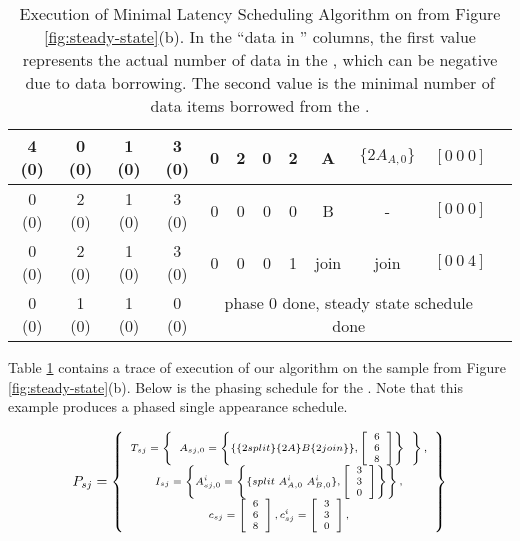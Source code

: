 \begin{table}[t]
\begin{tabular}{|c|c|c|c|c|c|c|c|c|c|c|c|}
\hline 4 (0) & 0 (0) & 1 (0) & 3 (0) & 0 & 2 & 0 & 2 & A & $\{2A_{A,0}\}$ & $[0\ 0\ 0]$ \\
\hline 0 (0) & 2 (0) & 1 (0) & 3 (0) & 0 & 0 & 0 & 0 & B & - & $[0\ 0\ 0]$ \\
\hline 0 (0) & 2 (0) & 1 (0) & 3 (0) & 0 & 0 & 0 & 1 & join & join  & $[0\ 0\ 4]$ \\
\hline 0 (0) &  1 (0) &  1 (0) &  0 (0) & \multicolumn{7}{|c|}{phase 0 done, steady state schedule done} \\
\hline
\end{tabular}
\caption[Execution of Minimal Latency Scheduling Algorithm on a
{\splitjoin}]{Execution of Minimal Latency Scheduling Algorithm on
{\splitjoin} from Figure \ref{fig:steady-state}(b). In the ``data
in {\Channel}'' columns, the first value represents the actual
number of data in the {\Channel}, which can be negative due to
data borrowing. The second value is the minimal number of data
items borrowed from the {\Channel}.}
\label{tbl:min-lat-sj}
\end{table}

Table \ref{tbl:min-lat-sj} contains a trace of execution of our
algorithm on the sample {\splitjoin} from Figure
\ref{fig:steady-state}(b). Below is the phasing schedule for the
{\splitjoin}. Note that this example produces a phased single
appearance schedule.

\begin{displaymath} \scriptsize
P_{sj} = \left\{
\begin{array}{c}
T_{sj} = \left\{
\begin{array}{c}
A_{sj,0} = \left\{ \{\{2 split\}\{2A\}B\{2 join\}\}, \left[\begin{array}{c} 6 \\ 6 \\ 8 \end{array}\right]\right\} \\
\end{array}\right\}, \\
I_{sj} = \left\{ A^i_{sj,0} = \left\{
\{split\ A^i_{A,0}\ A^i_{B,0}\}, \left[\begin{array}{c} 3 \\ 3 \\ 0 \\
\end{array}\right]\right\}
\right\}, \\
c_{sj} = \left[ \begin{array}{c} 6 \\ 6 \\ 8 \end{array} \right],
c^i_{sj} = \left[ \begin{array}{c} 3 \\ 3 \\ 0 \end{array}
\right],
\end{array}
\right\}
\end{displaymath}
